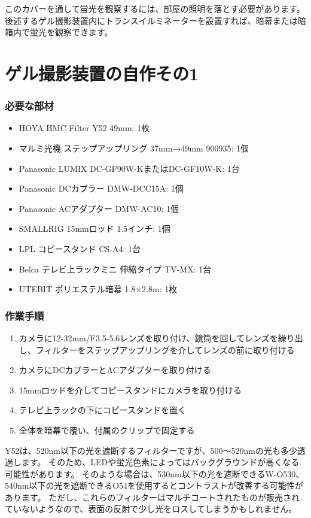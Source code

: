 \documentclass[titlepage,10pt,a4paper,uplatex]{jsbook}
\begin{document}
このカバーを通して蛍光を観察するには、部屋の照明を落とす必要があります。
後述するゲル撮影装置内にトランスイルミネーターを設置すれば、暗幕または暗箱内で蛍光を観察できます。

\section{ゲル撮影装置の自作その1}\label{makinggelimager1}

\subsubsection{必要な部材}
\begin{itemize}
\item HOYA HMC Filter Y52 49mm: 1枚
\item マルミ光機 ステップアップリング 37mm→49mm 900935: 1個
\item Panasonic LUMIX DC-GF90W-KまたはDC-GF10W-K: 1台
\item Panasonic DCカプラー DMW-DCC15A: 1個
\item Panasonic ACアダプター DMW-AC10: 1個
\item SMALLRIG 15mmロッド 1.5インチ: 1個
\item LPL コピースタンド CS-A4: 1台
\item Belca テレビ上ラックミニ 伸縮タイプ TV-MX: 1台
\item UTEBIT ポリエステル暗幕 1.8×2.8m: 1枚
\end{itemize}

\subsubsection{作業手順}
\begin{enumerate}
\item カメラに12-32mm/F3.5-5.6レンズを取り付け、鏡筒を回してレンズを繰り出し、フィルターをステップアップリングを介してレンズの前に取り付ける
\item カメラにDCカプラーとACアダプターを取り付ける
\item 15mmロッドを介してコピースタンドにカメラを取り付ける
\item テレビ上ラックの下にコピースタンドを置く
\item 全体を暗幕で覆い、付属のクリップで固定する
\end{enumerate}

Y52は、520nm以下の光を遮断するフィルターですが、500～520nmの光も多少透過します。
そのため、LEDや蛍光色素によってはバックグラウンドが高くなる可能性があります。
そのような場合は、530nm以下の光を遮断できるW-O530、540nm以下の光を遮断できるO54を使用するとコントラストが改善する可能性があります。
ただし、これらのフィルターはマルチコートされたものが販売されていないようなので、表面の反射で少し光をロスしてしまうかもしれません。
\end{document}
